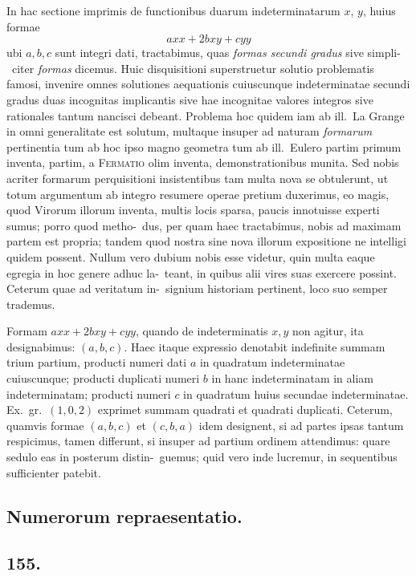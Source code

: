 \documentclass[12pt,a4paper]{article}
\theoremstyle{plain}
\theoremstyle{definition}
\theoremstyle{remark}
\begin{document}
In hac sectione imprimis de functionibus duarum indeterminatarum $x$, $y$,
huius formae
\[
axx + 2bxy + cyy
\]
ubi $a,b,c$ sunt integri dati, tractabimus, quas \emph{formas secundi gradus} sive simpli-\ citer \emph{formas} dicemus. Huic disquisitioni superstruetur solutio problematis famosi,
invenire omnes solutiones aequationis cuiuscunque indeterminatae secundi gradus
duas incognitas implicantis sive hae incognitae valores integros sive rationales
tantum nancisci debeant. Problema hoc quidem iam ab ill.\ La Grange in omni
generalitate est solutum, multaque insuper ad naturam \emph{formarum} pertinentia tum
ab hoc ipso magno geometra tum ab ill.\ Eulero partim primum inventa, partim,
a \textsc{Fermatio} olim inventa, demonstrationibus munita. Sed nobis acriter formarum
perquisitioni insistentibus tam multa nova se obtulerunt, ut totum argumentum
ab integro resumere operae pretium duxerimus, eo magis, quod Virorum illorum
inventa, multis locis sparsa, paucis innotuisse experti sumus; porro quod metho-\ dus, per quam haec tractabimus, nobis ad maximam partem est propria; tandem
quod nostra sine nova illorum expositione ne intelligi quidem possent. Nullum
vero dubium nobis esse videtur, quin multa eaque egregia in hoc genere adhuc la-\ teant, in quibus alii vires suas exercere possint. Ceterum quae ad veritatum in-\ signium historiam pertinent, loco suo semper trademus.

Formam $axx + 2bxy + cyy$, quando de indeterminatis $x,y$ non agitur,
ita designabimus: $(a,b,c)$. Haec itaque expressio denotabit indefinite summam
trium partium, producti numeri dati $a$ in quadratum indeterminatae cuiuscunque;
producti duplicati numeri $b$ in hanc indeterminatam in aliam indeterminatam;
producti numeri $c$ in quadratum huius secundae indeterminatae. Ex.\ gr.\ $(1, 0, 2)$
exprimet summam quadrati et quadrati duplicati. Ceterum, quamvis formae $(a,b,c)$
et $(c,b,a)$ idem designent, si ad partes ipsas tantum respicimus, tamen differunt,
si insuper ad partium ordinem attendimus: quare sedulo eas in posterum distin-\ guemus; quid vero inde lucremur, in sequentibus sufficienter patebit.

\subsection*{Numerorum repraesentatio.}

\subsection*{155.}
\end{document}
